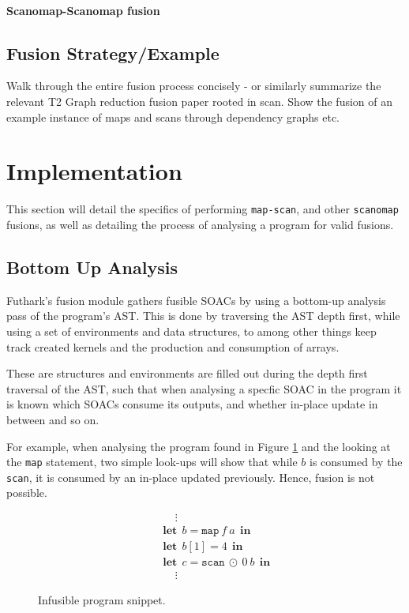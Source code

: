 \documentclass[11pt]{article}
\newcommand\lett{\phantom{-}\:\:\mathbf{let}\:\:}
\newcommand\inn{\:\:\mathbf{in}\:\:}
\begin{document}
\paragraph{Scanomap-Scanomap fusion}

\subsection{Fusion Strategy/Example}
Walk through the entire fusion process concisely - or similarly summarize the relevant T2 Graph reduction fusion paper rooted in scan.
Show the fusion of an example instance of maps and scans through dependency graphs etc.

\section{Implementation}
This section will detail the specifics of performing \texttt{map-scan}, and other \texttt{scanomap} fusions, as well as detailing the process of
 analysing a program for valid fusions.
\subsection{Bottom Up Analysis}
Futhark's fusion module gathers fusible SOACs by using a bottom-up analysis pass of the program's AST. This is done by traversing the AST depth first, while using a set
 of environments and data structures, to among other things keep track created kernels and the production and consumption of arrays. \cite{T2Fusion}

These are structures and environments are filled out during the depth first traversal of the AST, such that when analysing a specfic SOAC in the program it is known which
 SOACs consume its outputs, and whether in-place update in between and so on.

For example, when analysing the program found in Figure \ref{fig:progsnip1} and the looking at the \texttt{map} statement, two simple look-ups will show that while $b$ is consumed by the
 \texttt{scan}, it is consumed by an in-place updated previously. Hence, fusion is not possible.
\begin{figure}[hb!]
  \centering
  \begin{mdframed}[style=alignbox]
  \begin{align*}
    &\phantom{---}\vdots\\
    &\lett b = \mathtt{map} \: f \: a \inn\\
    &\lett b[1] = 4 \inn\\
    &\lett c = \mathtt{scan} \: \odot \: 0 \: b \inn\\
    &\phantom{---}\vdots
  \end{align*}
\end{mdframed}

  \caption{Infusible program snippet.}
  \label{fig:progsnip1}
\end{figure}
\end{document}
